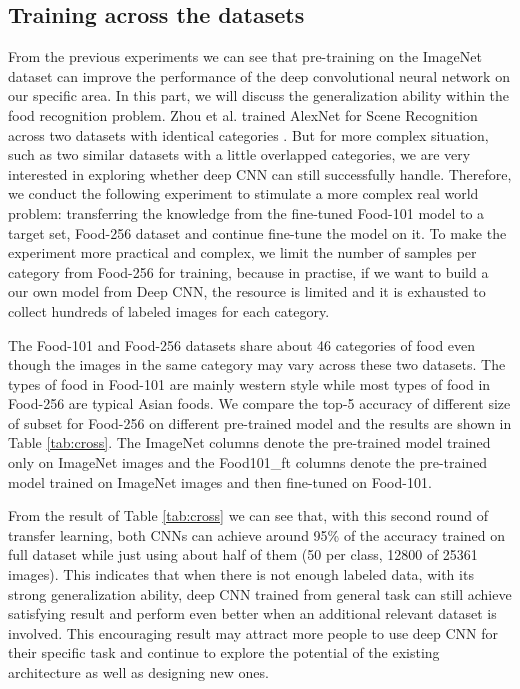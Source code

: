 \subsection{Training across the datasets}
From the previous experiments we can see that pre-training on the ImageNet dataset can improve the performance of the deep convolutional neural network on our specific area. In this part, we will discuss the generalization ability within the food recognition problem.  Zhou et al. trained AlexNet for Scene Recognition across two datasets with identical categories \cite{NIPS2014_Zhou}. But for more complex situation, such as two similar datasets with a little overlapped categories, we are very interested in exploring whether deep CNN can still successfully handle. Therefore, we conduct the following experiment to stimulate a more complex real world problem: transferring the knowledge from the fine-tuned Food-101 model to a target set, Food-256 dataset and continue fine-tune the model on it. To make the experiment more practical and complex, we limit the number of samples per category from Food-256 for training, because in practise, if we want to build a our own model from Deep CNN, the resource is limited and it is exhausted to collect hundreds of labeled images for each category.

The Food-101 and Food-256 datasets share about 46 categories of food even though the images in the same category may vary across these two datasets. The types of food in Food-101 are mainly western style while most types of food in Food-256 are typical Asian foods. We compare the top-5 accuracy of different size of subset for Food-256 on different pre-trained model and the results are shown in Table \ref{tab:cross}. The ImageNet columns denote the pre-trained model trained only on ImageNet images and the Food101\_ft columns denote the pre-trained model trained on ImageNet images and then fine-tuned on Food-101.

From the result of Table \ref{tab:cross} we can see that, with this second round of transfer learning, both CNNs can achieve around 95\% of the accuracy trained on full dataset while just using about half of them (50 per class, 12800 of 25361 images). This indicates that when there is not enough labeled data, with its strong generalization ability, deep CNN trained from general task can still achieve satisfying result and perform even better when an additional relevant dataset is involved. This encouraging result may attract more people to use deep CNN for their specific task and continue to explore the potential of the existing architecture as well as designing new ones.

